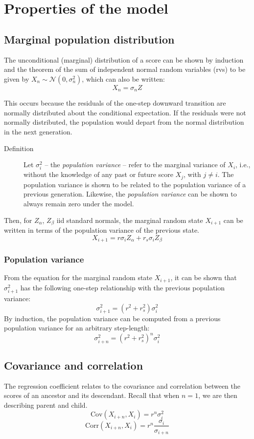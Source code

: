 \documentclass[a4paper,11pt]{article} %
\begin{document}
\section{Properties of the model}
\subsection{Marginal population distribution}
The unconditional (marginal) distribution of a score can be shown by induction and the theorem of the sum of independent normal random variables (rvs) to be given by $X_n \sim \mathcal{N}(0, \sigma_n^2)$, which can also be written:
$$X_n = \sigma_nZ$$

This occurs because the residuals of the one-step downward transition are normally distributed about the conditional expectation. If the residuals were not normally distributed, the population would depart from the normal distribution in the next generation.

\begin{description}
\item [Definition] Let $\sigma_i^2$ -- the \emph{population variance} -- refer to the marginal variance of $X_i$, i.e., without the knowledge of any past or future score $X_{j}$, with $j \neq i$. The population variance is shown to be related to the population variance of a previous generation. Likewise, the \emph{population variance} can be shown to always remain zero under the model. 
\end{description}

Then, for $Z_\alpha$, $Z_\beta$ iid standard normals, the marginal random state $X_{i+1}$ can be written in terms of the population variance of the previous state.
$$X_{i+1} = r\sigma_iZ_\alpha + r_s\sigma_iZ_\beta$$

\subsubsection*{Population variance}
From the equation for the marginal random state $X_{i+1}$, it can be shown that $\sigma_{i+1}^2$ has the following one-step relationship with the previous population variance:
$$\sigma_{i+1}^2 = (r^2+r_s^2)  \sigma_i^2$$
By induction, the population variance can be computed from a previous population variance for an arbitrary step-length:
$$\sigma_{i+n}^2 = (r^2+r_s^2)^n  \sigma_{i}^2$$




\subsection{Covariance and correlation}
The regression coefficient relates to the covariance and correlation between the scores of an ancestor and its descendant. Recall that when $n = 1$, we are then describing parent and child. 
$$\mathrm{Cov}(X_{i+n}, X_i) = r^n \sigma_i^2$$
$$\mathrm{Corr}(X_{i+n}, X_i) = r^n \frac{\sigma_i}{\sigma_{i+n}}$$
\end{document}
